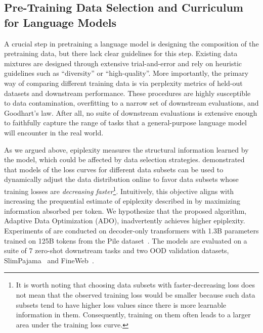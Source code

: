 \documentclass[twoside]{article}
\newcommand{\soph}[1]{epiplexity}
\begin{document}
%
    
%

%
%

\subsection{Pre-Training Data Selection and Curriculum for Language Models} \label{sec:ado}
A crucial step in pretraining a language model is designing the composition of the pretraining data, but there lack clear guidelines for this step.
Existing data mixtures are designed through extensive trial-and-error and rely on heuristic guidelines such as ``diversity'' or ``high-quality''.
More importantly, the primary way of comparing different training data is via perplexity metrics of held-out datasets and downstream performance.
These procedures are highly susceptible to data contamination, overfitting to a narrow set of downstream evaluations, and Goodhart's law. After all, no suite of downstream evaluations is extensive enough to faithfully capture the range of tasks that a general-purpose language model will encounter in the real world.

As we argued above, \soph{} measures the structural information learned by the model, which could be affected by data selection strategies. 
\citet{jiang2025adaptive} demonstrated that models of the loss curves for different data subsets can be used to dynamically adjust the data distribution online to favor data subsets whose training losses are \emph{decreasing faster}\footnote{It is worth noting that choosing data subsets with faster-decreasing loss does not mean that the observed training loss would be smaller because such data subsets tend to have higher loss values since there is more learnable information in them. Consequently, training on them often leads to a larger area under the training loss curve.}.
%
Intuitively, this objective aligns with increasing the prequential estimate of epiplexity described in  by maximizing information absorbed per token.
We hypothesize that the proposed algorithm, Adaptive Data Optimization (ADO), inadvertently achieves higher \soph{}.
Experiments of \citet{jiang2025adaptive} are conducted on decoder-only transformers with 1.3B parameters trained on 125B tokens from the Pile dataset~\citep{gao2020pile}.
The models are evaluated on a suite of 7 zero-shot downstream tasks and two OOD validation datasets, SlimPajama~\citep{cerebras2023slimpajama} and FineWeb~\citep{penedo2024fineweb}.
\end{document}
